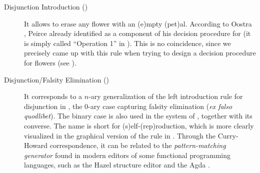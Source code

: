 \begin{description}
  \item[Disjunction Introduction ()]
    It allows to erase any flower with an \textsf{(e)}mpty \textsf{(pet)}al.
    According to Oostra \cite[p.~109]{oostra_advances_2022}, Peirce already
    identified  as a component of his decision procedure for
     (it is simply called ``Operation 1'' in
    \cite{oostra_advances_2022}). This is no coincidence, since we precisely
    came up with this rule when trying to design a decision procedure for
    flowers (see ).

  \item[Disjunction/Falsity Elimination ()]
    It corresponds to a $n$-ary generalization of the left introduction rule for
    disjunction in , the $0$-ary case capturing falsity
    elimination (\textit{ex falso quodlibet}). The binary case is also used in
    the  system of \cite{minghui_graphical_2019}, together with its converse.
    The name  is short for \textsf{(s)}elf-\textsf{(rep)}roduction,
    which is more clearly visualized in the graphical version of the rule in
    . Through the Curry-Howard correspondence, it can
    be related to the \emph{pattern-matching generator} found in modern editors
    of some functional programming languages, such as the Hazel structure editor
    and the Agda  .
\end{description}

